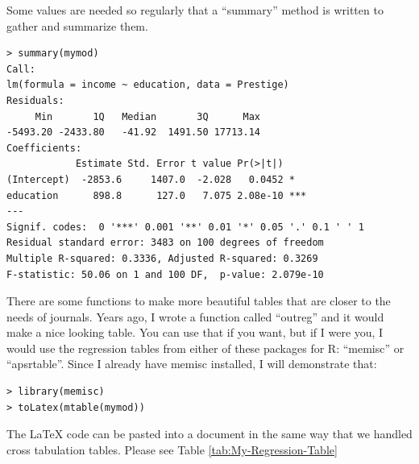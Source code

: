 Some values are needed so regularly that a ``summary'' method is
written to gather and summarize them.

\begin{lstlisting}
> summary(mymod)
Call:
lm(formula = income ~ education, data = Prestige)
Residuals:
     Min       1Q   Median       3Q      Max 
-5493.20 -2433.80   -41.92  1491.50 17713.14 
Coefficients:
            Estimate Std. Error t value Pr(>|t|)    
(Intercept)  -2853.6     1407.0  -2.028   0.0452 *  
education      898.8      127.0   7.075 2.08e-10 ***
---
Signif. codes:  0 '***' 0.001 '**' 0.01 '*' 0.05 '.' 0.1 ' ' 1 
Residual standard error: 3483 on 100 degrees of freedom
Multiple R-squared: 0.3336,	Adjusted R-squared: 0.3269 
F-statistic: 50.06 on 1 and 100 DF,  p-value: 2.079e-10 
\end{lstlisting}

There are some functions to make more beautiful tables that are closer
to the needs of journals. Years ago, I wrote a function called ``outreg''
and it would make a nice looking table. You can use that if you want,
but if I were you, I would use the regression tables from either of
these packages for R: ``memisc'' or ``apsrtable''. Since I already
have memisc installed, I will demonstrate that:

\begin{lstlisting}
> library(memisc)
> toLatex(mtable(mymod))
\end{lstlisting}

The \LaTeX{} code can be pasted into a document in the same way that
we handled cross tabulation tables. Please see Table \ref{tab:My-Regression-Table}


